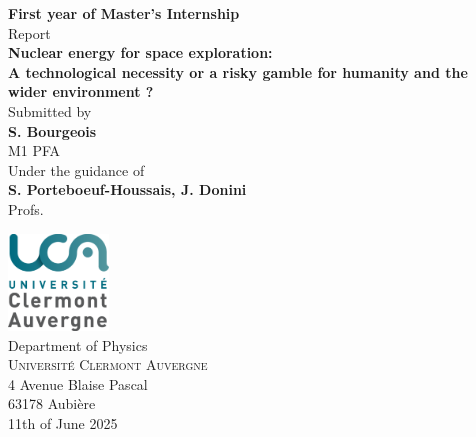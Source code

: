 \begin{titlepage}
\begin{center}

\textup{\small {\bf First year of Master's Internship} \\ Report}\\[2cm]

\LARGE \textbf {Nuclear energy for space exploration: \\
A technological necessity or a risky gamble for humanity and the wider environment ?}\\[3cm]



       

\normalsize Submitted by \\[0.2cm]
\textbf{S. Bourgeois}\\
M1 PFA\\
\vspace{0.5cm}
Under the guidance of\\[0.2cm]
\textbf{S. Porteboeuf-Houssais, J. Donini}\\
Profs.



\vspace{1cm}

\includegraphics[width=0.2\textwidth]{img/UCA-logo.png}\\[0.5cm]
\Large{Department of Physics}\\
\normalsize
\textsc{Université Clermont Auvergne}\\
4 Avenue Blaise Pascal\\
63178 Aubière\\
\vspace{0.2cm}
11th of June 2025

\end{center}

\end{titlepage}
\newpage
